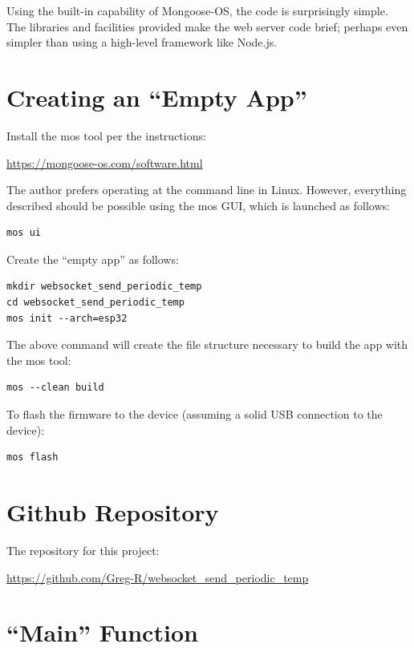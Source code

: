 \documentclass[oneside,letterpaper,12pt]{book}
\begin{document}
Using the built-in capability of Mongoose-OS, the code is surprisingly
simple. The libraries and facilities provided make the web server code
brief; perhaps even simpler than using a high-level framework like
Node.js.

\section{\texorpdfstring{Creating an ``Empty
App''}{Creating an Empty App}}\label{creating-an-empty-app}

Install the mos tool per the instructions:

\url{https://mongoose-os.com/software.html}

The author prefers operating at the command line in Linux. However,
everything described should be possible using the mos GUI, which is
launched as follows:

\begin{verbatim}
mos ui
\end{verbatim}

Create the ``empty app'' as follows:

\begin{verbatim}
mkdir websocket_send_periodic_temp
cd websocket_send_periodic_temp
mos init --arch=esp32
\end{verbatim}

The above command will create the file structure necessary to build the
app with the mos tool:

\begin{verbatim}
mos --clean build
\end{verbatim}

To flash the firmware to the device (assuming a solid USB connection to
the device):

\begin{verbatim}
mos flash
\end{verbatim}

\section{Github Repository}\label{github-repository}

The repository for this project:

\url{https://github.com/Greg-R/websocket_send_periodic_temp}

\section{\texorpdfstring{``Main''
Function}{Main Function}}\label{main-function}
\end{document}
